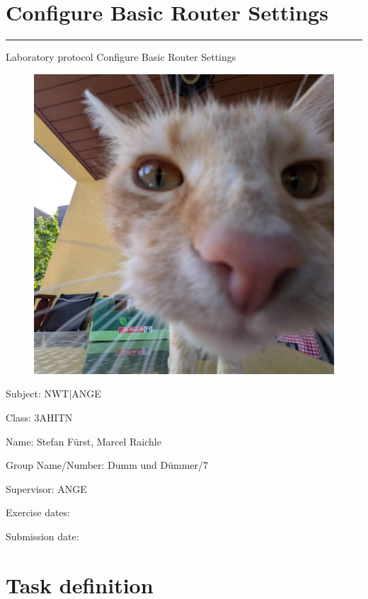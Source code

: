 \documentclass[a4paper]{article}
\begin{document}
\pagestyle{oida}
\section*{Configure Basic Router Settings}
\par\noindent\rule{\textwidth}{0.4pt}

Laboratory protocol
Configure Basic Router Settings

\begin{figure}[h]
	\includegraphics[scale=0.2]{images/mika.jpeg}
	\centering
\end{figure}

\vspace*{\fill}
Subject:	NWT|ANGE

Class:	3AHITN

Name:	Stefan Fürst, Marcel Raichle

Group Name/Number: Dumm und Dümmer/7

Supervisor: 	ANGE

Exercise dates:	

Submission date:


\newpage
\tableofcontents

\newpage

\section{Task definition}
\end{document}
